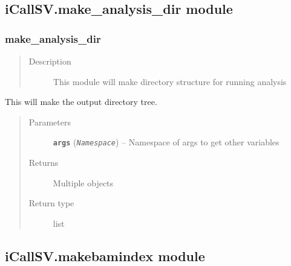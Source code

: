 \documentclass[letterpaper,10pt,english]{sphinxmanual}
\begin{document}
\subsection{iCallSV.make\_analysis\_dir module}
\label{iCallSV:module-iCallSV.make_analysis_dir}\label{iCallSV:icallsv-make-analysis-dir-module}

\subsubsection{make\_analysis\_dir}
\label{iCallSV:make-analysis-dir}\begin{quote}\begin{description}
\item[{Description}] \leavevmode
This module will make directory structure for running analysis

\end{description}\end{quote}

\begin{fulllineitems}
\label{iCallSV:iCallSV.make_analysis_dir.makeOutputDir}
This will make the output directory tree.
\begin{quote}\begin{description}
\item[{Parameters}] \leavevmode
\textbf{\texttt{args}} (\emph{\texttt{Namespace}}) -- Namespace of args to get other variables

\item[{Returns}] \leavevmode
Multiple objects

\item[{Return type}] \leavevmode
list

\end{description}\end{quote}

\end{fulllineitems}



\subsection{iCallSV.makebamindex module}
\label{iCallSV:module-iCallSV.makebamindex}\label{iCallSV:icallsv-makebamindex-module}
\end{document}

